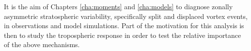It is the aim of Chapters \ref{cha:moments} and \ref{cha:models} to diagnose
zonally asymmetric stratospheric variability, specifically split and displaced
vortex events, in observations and model simulations. Part of the motivation for
this analysis is then to study the tropospheric response in order to test the
relative importance of the above mechanisms.














